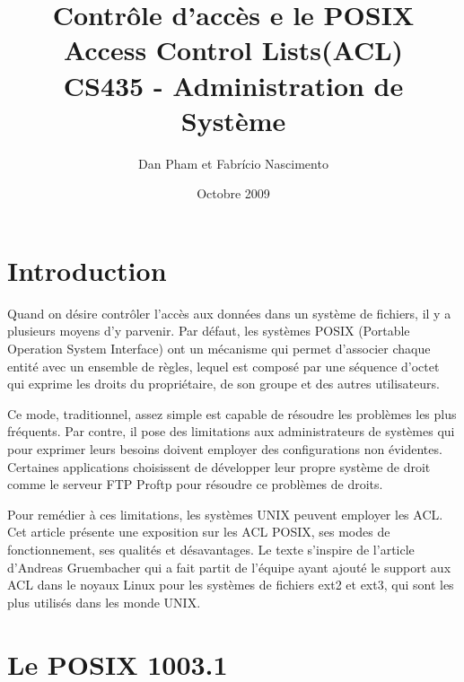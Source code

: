 \usepackage[francais]{babel}
\usepackage[utf8]{inputenc}

\usepackage{graphicx} 

\usepackage{algorithmic}
\usepackage{algorithm}


\title{\textbf{Contrôle d'accès e le POSIX Access Control Lists(ACL)} \\ CS435 - Administration de Système }
\author{Dan Pham et Fabrício Nascimento}
\date{Octobre 2009}



\maketitle
\newpage

\section*{Introduction}
Quand on désire contrôler l'accès aux données dans un système de fichiers, il y a plusieurs moyens d’y parvenir. Par défaut, les systèmes POSIX (Portable Operation System Interface)\cite{ieee1,ieee2} ont un mécanisme qui permet d’associer chaque entité avec un ensemble de règles, lequel est composé par une séquence d'octet qui exprime les droits du propriétaire, de son groupe et des autres utilisateurs.

Ce mode, traditionnel, assez simple est capable de résoudre les problèmes les plus fréquents. Par contre, il pose des limitations aux administrateurs de systèmes qui pour exprimer leurs besoins doivent employer des configurations non évidentes. Certaines applications choisissent de développer leur propre système de droit comme le serveur FTP Proftp\cite{ftp} pour résoudre ce problèmes de droits.

Pour remédier à ces limitations, les systèmes UNIX peuvent employer les ACL. Cet article présente une exposition sur les ACL POSIX, ses modes de fonctionnement, ses qualités et désavantages. Le texte s’inspire de l'article d’Andreas Gruembacher\cite{aclsuse} qui a fait partit de l’équipe ayant ajouté le support aux ACL dans le noyaux Linux pour les systèmes de fichiers ext2 et ext3, qui sont les plus utilisés dans les monde UNIX.
\section{Le POSIX 1003.1}
 

